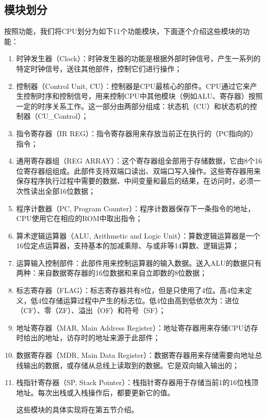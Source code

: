 \documentclass[titlepage, 11pt]{article}
\begin{document}
	\subsection{模块划分}
	按照功能，我们将CPU划分为如下11个功能模块，下面逐个介绍这些模块的功能：
	\begin{enumerate}%
		\item 时钟发生器（Clock）：时钟发生器的功能是根据外部时钟信号，产生一系列的特定时钟信号，送往其他部件，控制它们进行操作；
		\item 控制器（Control Unit, CU）：控制器是CPU最核心的部件。CPU通过它来产生控制时序和控制信号，用来控制CPU中其他模块（例如ALU、寄存器）按照一定的时序关系工作。这一部分由两部分组成：状态机（CU）和状态机的控制器（CU\_Control）；
		\item 指令寄存器（IR REG）：指令寄存器用来存放当前正在执行的（PC指向的）指令；
		\item 通用寄存器组（REG ARRAY）：这个寄存器组全部用于存储数据，它由8个16位寄存器组组成。此部件支持双端口读出、双端口写入操作。这些寄存器用来保存程序执行过程中需要的数据、中间变量和最后的结果，在访问时，必须一次性读出全部16位数据；
		\item 程序计数器（PC, Program Counter）：程序计数器保存下一条指令的地址，CPU使用它在相应的ROM中取出指令；
		\item 算术逻辑运算器（ALU, Arithmetic and Logic Unit）：算数逻辑运算器是一个16位定点运算器，支持基本的加减乘除、与或非等14算数、逻辑运算；
		\item 运算输入控制部件：此部件用来控制运算器的输入数据。送入ALU的数据只有两种：来自数据寄存器的16位数据和来自立即数的8位数据；
		\item 标志寄存器（FLAG）：标志寄存器共有8位，但是只使用了4位。高4位未定义，低4位存储运算过程中产生的标志位。低4位由高到低依次为：进位（CF）、零（ZF）、溢出（OF）和符号（SF）；
		\item 地址寄存器（MAR, Main Address Register）：地址寄存器用来存储CPU访存时给出的地址，访存时的地址来源于此部件；
		\item 数据寄存器（MDR, Main Data Register）：数据寄存器用来存储需要向地址总线输出的数据，或存储从总线上读取到的数据。它是双向输入输出的；
		\item 栈指针寄存器（SP, Stack Pointer）：栈指针寄存器用于存储当前1的16位栈顶地址。每次出栈或入栈操作后，都要更新它的值。\par 
		这些模块的具体实现将在第五节介绍。
	\end{enumerate}
\end{document}
